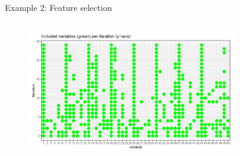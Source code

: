 \documentclass[11pt,compress,t,notes=noshow, xcolor=table]{beamer}
\begin{document}
\begin{vbframe}{Example 2: Feature selection}
\vspace{0.5cm}
\begin{center}
\begin{figure}
  \includegraphics[height = 6cm, width = 9cm]{figure_man/var-selection2.png}
\end{figure}
\end{center}

\end{vbframe}









%
%
%
\end{document}
